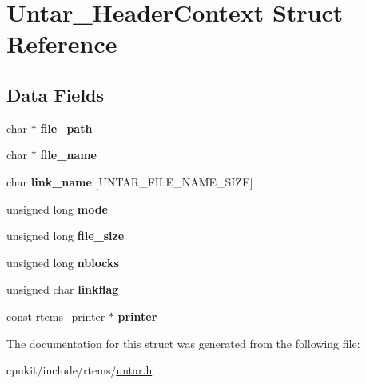 \hypertarget{structUntar__HeaderContext}{}\section{Untar\+\_\+\+Header\+Context Struct Reference}
\label{structUntar__HeaderContext}
\subsection*{Data Fields}
\begin{DoxyCompactItemize}
\item 
\mbox{\label{structUntar__HeaderContext_a8ef7a7a8f2c9e3afa67ca907b3c60d6e}} 
char $\ast$ {\bfseries file\+\_\+path}
\item 
\mbox{\label{structUntar__HeaderContext_aab4981096ecbdd8d213b3d5103b5fa73}} 
char $\ast$ {\bfseries file\+\_\+name}
\item 
\mbox{\label{structUntar__HeaderContext_a54573bb20f8150f50bc3f50d199cdcc9}} 
char {\bfseries link\+\_\+name} \mbox{[}U\+N\+T\+A\+R\+\_\+\+F\+I\+L\+E\+\_\+\+N\+A\+M\+E\+\_\+\+S\+I\+ZE\mbox{]}
\item 
\mbox{\label{structUntar__HeaderContext_ac51dbd8c731778b78c2de2aa2b679e98}} 
unsigned long {\bfseries mode}
\item 
\mbox{\label{structUntar__HeaderContext_a4647a2fab6fce871e4b2989357de6bce}} 
unsigned long {\bfseries file\+\_\+size}
\item 
\mbox{\label{structUntar__HeaderContext_a9165dfb5f91ae10836d43b0731b2bd2e}} 
unsigned long {\bfseries nblocks}
\item 
\mbox{\label{structUntar__HeaderContext_ae67062bfc079f95c9c57b3c0157f4daf}} 
unsigned char {\bfseries linkflag}
\item 
\mbox{\label{structUntar__HeaderContext_a7b4d18f12ec4fa29b335c4b7110fa967}} 
const \mbox{\hyperlink{structrtems__printer}{rtems\+\_\+printer}} $\ast$ {\bfseries printer}
\end{DoxyCompactItemize}


The documentation for this struct was generated from the following file\+:\begin{DoxyCompactItemize}
\item 
cpukit/include/rtems/\mbox{\hyperlink{untar_8h}{untar.\+h}}\end{DoxyCompactItemize}
